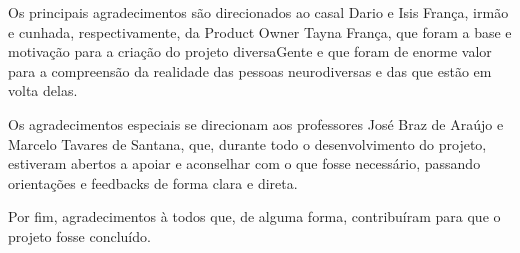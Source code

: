 \begin{agradecimentos}
Os principais agradecimentos são direcionados ao casal Dario e Isis França, irmão e cunhada, respectivamente, da Product Owner Tayna França, que foram a base e motivação para a criação do projeto diversaGente e que foram de enorme valor para a compreensão da realidade das pessoas neurodiversas e das que estão em volta delas.

Os agradecimentos especiais se direcionam aos professores José Braz de Araújo e Marcelo Tavares de Santana, que, durante todo o desenvolvimento do projeto, estiveram abertos a apoiar e aconselhar com o que fosse necessário, passando orientações e feedbacks de forma clara e direta.

Por fim, agradecimentos à todos que, de alguma forma, contribuíram para que o projeto fosse concluído.

\end{agradecimentos}

